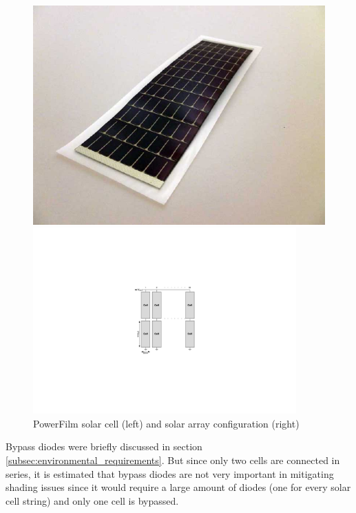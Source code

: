 \begin{figure}[H]
\centering
\begin{minipage}[c]{0.4\linewidth}
\centering
\includegraphics[width=\textwidth]{figures/SolarCell_RC7-2_Powerfilm}
\end{minipage}
\hspace{5mm}
\begin{minipage}[c]{0.55\linewidth}
\centering
\includegraphics[width=0.9\textwidth]{figures/fig_CDR_Solar_Array}
\end{minipage}
\caption[PowerFilm solar cell and solar array configuration]{PowerFilm solar cell (left) and solar array configuration (right)}
\label{fig:solar_cell}
\end{figure}
%
\noindent
Bypass diodes were briefly discussed in section \ref{subsec:environmental_requirements}.
But since only two cells are connected in series, it is estimated that bypass diodes are not very important in mitigating shading issues since it would require a large amount of diodes (one for every solar cell string) and only one cell is bypassed.
%
